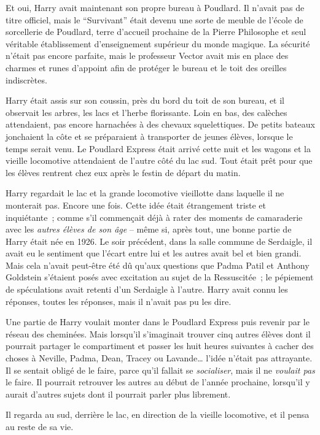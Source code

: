 Et oui, Harry avait maintenant son propre bureau à Poudlard.
Il n'avait pas de titre officiel, mais le “Survivant” était devenu une sorte de meuble de l'école de sorcellerie de Poudlard, terre d'accueil prochaine de la Pierre Philosophe et seul véritable établissement d'enseignement supérieur du monde magique.
La sécurité n'était pas encore parfaite, mais le professeur Vector avait mis en place des charmes et runes d'appoint afin de protéger le bureau et le toit des oreilles indiscrètes.

Harry était assis sur son coussin, près du bord du toit de son bureau, et il observait les arbres, les lacs et l'herbe florissante.
Loin en bas, des calèches attendaient, pas encore harnachées à des chevaux squelettiques.
De petits bateaux jonchaient la côte et se préparaient à transporter de jeunes élèves, lorsque le temps serait venu.
Le Poudlard Express était arrivé cette nuit et les wagons et la vieille locomotive attendaient de l'autre côté du lac sud.
Tout était prêt pour que les élèves rentrent chez eux après le festin de départ du matin.

Harry regardait le lac et la grande locomotive vieillotte dans laquelle il ne monterait pas.
Encore une fois.
Cette idée était étrangement triste et inquiétante~; comme s'il commençait déjà à rater des moments de camaraderie avec les \emph{autres élèves de son âge} -- même si, après tout, une bonne partie de Harry était née en 1926.
Le soir précédent, dans la salle commune de Serdaigle, il avait eu le sentiment que l'écart entre lui et les autres avait bel et bien grandi.
Mais cela n'avait peut-être été dû qu'aux questions que Padma Patil et Anthony Goldstein s'étaient posés avec excitation au sujet de la Ressuscitée~; le pépiement de spéculations avait retenti d'un Serdaigle à l'autre.
Harry avait connu les réponses, toutes les réponses, mais il n'avait pas pu les dire.

Une partie de Harry voulait monter dans le Poudlard Express puis revenir par le réseau des cheminées.
Mais lorsqu'il s'imaginait trouver cinq autres élèves dont il pourrait partager le compartiment et passer les huit heures suivantes à cacher des choses à Neville, Padma, Dean, Tracey ou Lavande… l'idée n'était pas attrayante.
Il se sentait obligé de le faire, parce qu'il fallait se \emph{socialiser}, mais il ne \emph{voulait pas} le faire.
Il pourrait retrouver les autres au début de l'année prochaine, lorsqu'il y aurait d'autres sujets dont il pourrait parler plus librement.

Il regarda au sud, derrière le lac, en direction de la vieille locomotive, et il pensa au reste de sa vie.

